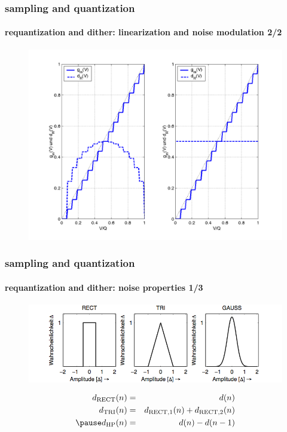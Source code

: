	\begin{frame}\frametitle{sampling and quantization}\framesubtitle{requantization and dither: linearization and noise modulation 2/2}
		\begin{figure}
			\begin{center}
					\includegraphics[scale=0.5]{Graph/rauschmodulation}
			\end{center}
		\end{figure}	
	\end{frame}	
	\begin{frame}\frametitle{sampling and quantization}\framesubtitle{requantization and dither: noise properties 1/3}
		\begin{figure}[htbp]
			\centering
				\includegraphics[scale=0.8]{Graph/dither_amplitudendichteverteilung.png}
		\end{figure}
		\pause
		\begin{eqnarray}\label{eq:ditherformen}
			d_\mathrm{RECT}(n) &=& d(n)\\
			d_\mathrm{TRI}(n) &=& d_\mathrm{RECT,1}(n)+d_\mathrm{RECT,2}(n)\\
			\pause
            d_\mathrm{HP}(n) &=& d(n)-d(n-1)
		\end{eqnarray}
	\end{frame}	
